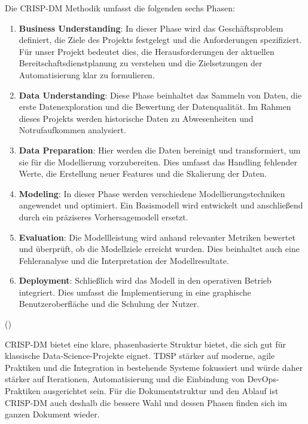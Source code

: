 \documentclass[%
pdftex,
oneside,			%
11pt,				%
parskip=half,		%
headheight = 12pt,	%
headsepline,		%
footsepline,		%
footheight = 16pt,	%
abstracton,		%
DIV=calc,		%
BCOR=8mm,		%
headinclude=false,	%
footinclude=false,	%
listof=totoc,		%
toc=bibliography,	%
]{scrreprt}	%
\begin{document}
        Die CRISP-DM Methodik umfasst die folgenden sechs Phasen:

        \begin{enumerate}
            \item \textbf{Business Understanding}: In dieser Phase wird das Geschäftsproblem definiert, die Ziele des Projekts festgelegt und die Anforderungen spezifiziert. 
            Für unser Projekt bedeutet dies, die Herausforderungen der aktuellen Bereitschaftsdienstplanung zu verstehen und die Zielsetzungen der Automatisierung klar zu formulieren.
            \item \textbf{Data Understanding}: Diese Phase beinhaltet das Sammeln von Daten, die erste Datenexploration und die Bewertung der Datenqualität. 
            Im Rahmen dieses Projekts werden historische Daten zu Abwesenheiten und Notrufaufkommen analysiert.
            \item \textbf{Data Preparation}: Hier werden die Daten bereinigt und transformiert, um sie für die Modellierung vorzubereiten. 
            Dies umfasst das Handling fehlender Werte, die Erstellung neuer Features und die Skalierung der Daten.
            \item \textbf{Modeling}: In dieser Phase werden verschiedene Modellierungstechniken angewendet und optimiert. 
            Ein Basismodell wird entwickelt und anschließend durch ein präziseres Vorhersagemodell ersetzt.
            \item \textbf{Evaluation}: Die Modellleistung wird anhand relevanter Metriken bewertet und überprüft, ob die Modellziele erreicht wurden. 
            Dies beinhaltet auch eine Fehleranalyse und die Interpretation der Modellresultate.
            \item \textbf{Deployment}: Schließlich wird das Modell in den operativen Betrieb integriert. 
            Dies umfasst die Implementierung in eine graphische Benutzeroberfläche und die Schulung der Nutzer.
        \end{enumerate}
        (\cite[Vgl.][S. 14]{shearer2000crisp})

        CRISP-DM bietet eine klare, phasenbasierte Struktur bietet, die sich gut für klassische Data-Science-Projekte eignet.
        TDSP stärker auf moderne, agile Praktiken und die Integration in bestehende Systeme fokussiert und würde daher stärker auf Iterationen, Automatisierung und die Einbindung von DevOps-Praktiken ausgerichtet sein.
        Für die Dokumentstruktur und den Ablauf ist CRISP-DM auch deshalb die bessere Wahl und dessen Phasen finden sich im ganzen Dokument wieder.
\end{document}
